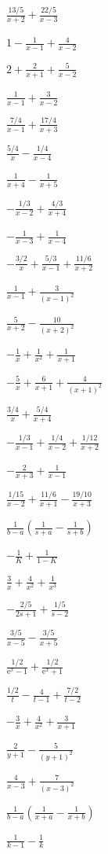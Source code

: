\begin{solutions}
  \item $\displaystyle\frac{13/5}{x+2}+\frac{22/5}{x-3}$
  \item $1-\displaystyle\frac{1}{x-1}+\frac{4}{x-2}$
  \item $2+\displaystyle\frac{2}{x+1}+\frac{5}{x-2}$
  \item $\displaystyle\frac{1}{x-1}+\frac{3}{x-2}$
  \item $\displaystyle\frac{7/4}{x-1}+\frac{17/4}{x+3}$
  \item $\displaystyle\frac{5/4}{x}-\frac{1/4}{x-4}$
  \item $\displaystyle\frac{1}{x+4}-\frac{1}{x+5}$
  \item $\displaystyle-\frac{1/3}{x-2}+\frac{4/3}{x+4}$
  \item $\displaystyle-\frac{1}{x-3}+\frac{1}{x-4}$
  \item $\displaystyle-\frac{3/2}{x}+\frac{5/3}{x-1}+\frac{11/6}{x+2}$
  \item $\displaystyle\frac{1}{x-1}+\frac{3}{(x-1)^{2}}$
  \item $\displaystyle\frac{5}{x+2}-\frac{10}{(x+2)^{2}}$
  \item $\displaystyle-\frac{1}{x}+\frac{1}{x^{2}}+\frac{1}{x+1}$
  \item $\displaystyle-\frac{5}{x}+\frac{6}{x+1}+\frac{4}{(x+1)^{2}}$
  \item $\displaystyle\frac{3/4}{x}+\frac{5/4}{x+4}$
  \item $\displaystyle-\frac{1/3}{x-1}+\frac{1/4}{x-2}+\frac{1/12}{x+2}$
  \item $\displaystyle-\frac{2}{x+3}+\frac{1}{x-1}$
  \item $\displaystyle\frac{1/15}{x-2}+\frac{11/6}{x+1}-\frac{19/10}{x+3}$
  \item $\displaystyle\frac{1}{b-a}\left(\frac{1}{s+a}-\frac{1}{s+b}\right)$
  \item $\displaystyle-\frac{1}{K}+\frac{1}{1-K}$
  \item $\displaystyle\frac{3}{x}+\frac{4}{x^{2}}+\frac{1}{x^{3}}$
  \item $\displaystyle-\frac{2/5}{2s+1}+\frac{1/5}{s-2}$
  \item $\displaystyle\frac{3/5}{x-5}-\frac{3/5}{x+5}$
  \item $\displaystyle\frac{1/2}{\mathrm{e}^{x}-1}+\frac{1/2}{\mathrm{e}^{x}+1}$
  \item $\displaystyle\frac{1/2}{t}-\frac{4}{t-1}+\frac{7/2}{t-2}$
  \item $\displaystyle-\frac{3}{x}+\frac{4}{x^{2}}+\frac{3}{x+1}$
  \item $\displaystyle\frac{2}{y+1}-\frac{5}{(y+1)^{2}}$
  \item $\displaystyle\frac{4}{x-3}+\frac{7}{(x-3)^{2}}$
  \item $\displaystyle\frac{1}{b-a}\left(\frac{1}{x+a}-\frac{1}{x+b}\right)$
  \item $\displaystyle\frac{1}{k-1}-\frac{1}{k}$
\end{solutions}
